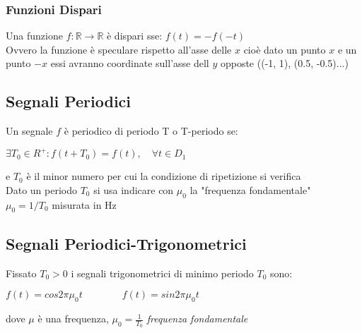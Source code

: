     \subsubsection{Funzioni Dispari}
        Una funzione $f:\mathbb{R}\rightarrow\mathbb{R}$ è dispari sse: $f(t)=-f(-t)$\\
        Ovvero la funzione è speculare rispetto all'asse delle $x$ cioè dato un punto $x$ e un punto $-x$ essi avranno coordinate sull'asse dell $y$ opposte ((-1, 1), (0.5, -0.5)...)
        \begin{center}
        \end{center}
    \newpage
    
    \subsection{Segnali Periodici}
        Un segnale $f$ è periodico di periodo T o T-periodo se:\\
        \begin{center}
            $\exists T_0\in R^+:f(t+T_0)=f(t),\quad \forall t\in D_1$
        \end{center}
        e $T_0$ è il minor numero per cui la condizione di ripetizione si verifica\\
        
        \noindent
        Dato un periodo $T_0$ si usa indicare con $\mu_0$ la "frequenza fondamentale"\\ $\mu_0=1/T_0$ misurata in Hz
    \subsection{Segnali Periodici-Trigonometrici}
    Fissato $T_0>0$ i segnali trigonometrici di minimo periodo $T_0$ sono:\\
    \begin{center}
        $f(t)=cos2\pi\mu_0t \qquad\qquad f(t)=sin2\pi\mu_0t$
    \end{center}
    dove $\mu$ è una frequenza, $\mu_0=\frac{1}{T_0}$ \textit{frequenza fondamentale}\\
    
